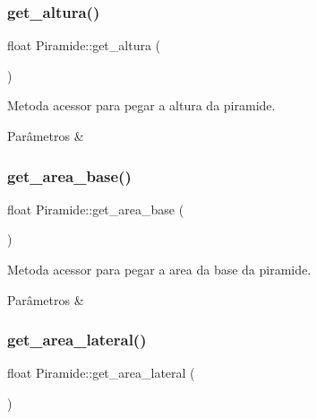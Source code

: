 \subsubsection{\texorpdfstring{get\+\_\+altura()}{get\_altura()}}
{\footnotesize\ttfamily float Piramide\+::get\+\_\+altura (\begin{DoxyParamCaption}{ }\end{DoxyParamCaption})}



Metoda acessor para pegar a altura da piramide. 


\begin{DoxyParams}{Parâmetros}
{\em } & \\
\hline
\end{DoxyParams}
\mbox{\label{classPiramide_ad97233120a836340667b2a6d95e1bb4e}} 
\subsubsection{\texorpdfstring{get\+\_\+area\+\_\+base()}{get\_area\_base()}}
{\footnotesize\ttfamily float Piramide\+::get\+\_\+area\+\_\+base (\begin{DoxyParamCaption}{ }\end{DoxyParamCaption})}



Metoda acessor para pegar a area da base da piramide. 


\begin{DoxyParams}{Parâmetros}
{\em } & \\
\hline
\end{DoxyParams}
\mbox{\label{classPiramide_a868f5e0f60c0af1c6e1f6ff8f002ec19}} 
\subsubsection{\texorpdfstring{get\+\_\+area\+\_\+lateral()}{get\_area\_lateral()}}
{\footnotesize\ttfamily float Piramide\+::get\+\_\+area\+\_\+lateral (\begin{DoxyParamCaption}{ }\end{DoxyParamCaption})}



